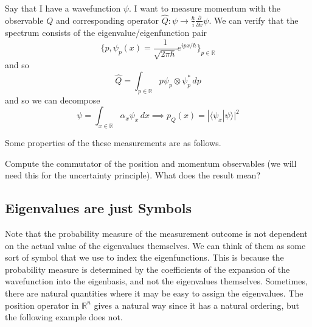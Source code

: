 \documentclass{article}
\newcommand{\braket}[2]{\langle #1 | #2 \rangle}
\begin{document}
  \begin{example}
    Say that I have a wavefunction $\psi$. I want to measure momentum with the observable $Q$ and corresponding operator $\hat{Q}: \psi \rightarrow \frac{\hbar}{i} \frac{\partial}{\partial x} \psi$. We can verify that the spectrum consists of the eigenvalue/eigenfunction pair 
    \begin{equation} 
      \bigg\{ p, \psi_p (x) = \frac{1}{\sqrt{2 \pi \hbar}} e^{i p x /\hbar} \bigg\}_{p \in \mathbb{R}}
    \end{equation}
    and so 
    \begin{equation} 
      \hat{Q} = \int_{p \in \mathbb{R}} p \psi_p \otimes \psi_p^\ast \,dp 
    \end{equation}
    and so we can decompose 
    \begin{equation} 
      \psi = \int_{x \in \mathbb{R}} \alpha_x \psi_x \,dx \implies p_Q (x) = |\braket{\psi_x}{\psi}|^2 
    \end{equation}
  \end{example}

  Some properties of the these measurements are as follows. 

  \begin{exercise}
    Compute the commutator of the position and momentum observables (we will need this for the uncertainty principle).  What does the result mean? 
  \end{exercise}

  \subsection{Eigenvalues are just Symbols}

    Note that the probability measure of the measurement outcome is not dependent on the actual value of the eigenvalues themselves. We can think of them as some sort of symbol that we use to index the eigenfunctions. This is because the probability measure is determined by the coefficients of the expansion of the wavefunction into the eigenbasis, and not the eigenvalues themselves. Sometimes, there are natural quantities where it may be easy to assign the eigenvalues. The position operator in $\mathbb{R}^n$ gives a natural way since it has a natural ordering, but the following example does not.
\end{document}
